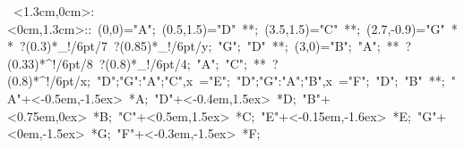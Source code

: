%


\hbox{
\xy    <1.3cm,0cm>:<0cm,1.3cm>::
       (0,0)="A";  (0.5,1.5)="D" **\dir{-}; (3.5,1.5)="C" **\dir{-};  
	 (2.7,-0.9)="G" **\dir{-} ?(0.3)*_!/6pt/{7} ?(0.85)*_!/6pt/{y}; 
	 "G"; "D" **\dir{-}; (3,0)="B"; "A"; **\dir{-} ?(0.33)*^!/6pt/{8} ?(0.8)*_!/6pt/{4}; 
       "A"; "C"; **\dir{-}  ?(0.8)*^!/6pt/{x};   
	 {"D";"G":"A";"C",x} ="E";
	 {"D";"G":"A";"B",x} ="F";
       "D"; "B" **\dir{-};
       "A"+<-0.5em,-1.5ex> *{A};
       "D"+<-0.4em,1.5ex> *{D};
       "B"+<0.75em,0ex> *{B};
       "C"+<0.5em,1.5ex> *{C};
       "E"+<-0.15em,-1.6ex> *{E};
       "G"+<0em,-1.5ex> *{G};       "F"+<-0.3em,-1.5ex> *{F};
       \endxy}
	   

